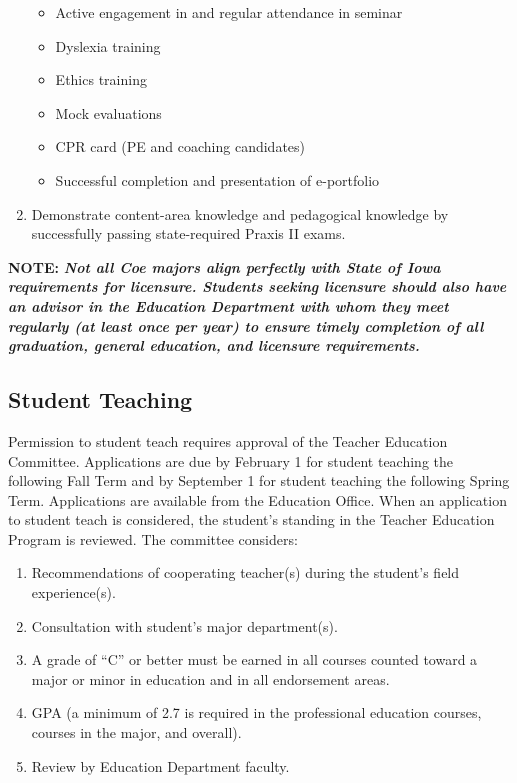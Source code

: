 \documentclass[
  letterpaper,
]{scrbook}
\providecommand{\tightlist}{%
  \setlength{\itemsep}{0pt}\setlength{\parskip}{0pt}}
\begin{document}
\begin{enumerate}
  \begin{itemize}
  \tightlist
  \item
    Active engagement in and regular attendance in seminar
  \item
    Dyslexia training
  \item
    Ethics training
  \item
    Mock evaluations
  \item
    CPR card (PE and coaching candidates)
  \item
    Successful completion and presentation of e-portfolio
  \end{itemize}
\item
  Demonstrate content-area knowledge and pedagogical knowledge by
  successfully passing state-required Praxis II exams.
\end{enumerate}

\textbf{NOTE:} \textbf{\emph{Not all Coe majors align perfectly with
State of Iowa requirements for licensure. Students seeking licensure
should also have an advisor in the Education Department with whom they
meet regularly (at least once per year) to ensure timely completion of
all graduation, general education, and licensure requirements.}}

\subsection{Student Teaching}\label{student-teaching}

Permission to student teach requires approval of the Teacher Education
Committee. Applications are due by February 1 for student teaching the
following Fall Term and by September 1 for student teaching the
following Spring Term. Applications are available from the Education
Office. When an application to student teach is considered, the
student's standing in the Teacher Education Program is reviewed. The
committee considers:

\begin{enumerate}
\def\labelenumi{\arabic{enumi}.}
\tightlist
\item
  Recommendations of cooperating teacher(s) during the student's field
  experience(s).
\item
  Consultation with student's major department(s).
\item
  A grade of ``C'' or better must be earned in all courses counted
  toward a major or minor in education and in all endorsement areas.
\item
  GPA (a minimum of 2.7 is required in the professional education
  courses, courses in the major, and overall).
\item
  Review by Education Department faculty.
\end{enumerate}
\end{document}
